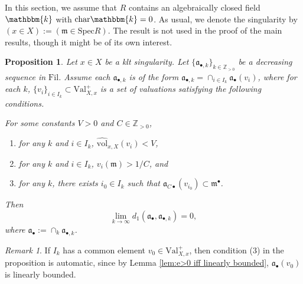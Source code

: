\documentclass[11pt, leqno]{amsart}%
\theoremstyle{plain}
\newtheorem{proposition}[theorem]{Proposition}
\theoremstyle{definition}
\theoremstyle{remark}
\newtheorem{remark}[theorem]{Remark}
\newcommand{\bZ}{\mathbb{Z}}
\newcommand{\fa}{\mathfrak{a}}
\newcommand{\fm}{\mathfrak{m}}
\newcommand{\Val}{\mathrm{Val}}
\newcommand{\nvol}{\widehat{\mathrm{vol}}}
\newcommand{\Spec}{\mathrm{Spec}}
\newcommand{\bk}{\mathbbm{k}}
\newcommand{\Fil}{\mathrm{Fil}}
\numberwithin{equation}{section}
\begin{document}
In this section, we assume that $R$ contains an algebraically closed field $\bk$ with $\mathrm{char}\bk=0$. As usual, we denote the singularity by $(x\in X):=(\fm\in\Spec R)$. The result is not used in the proof of the main results, though it might be of its own interest.

\begin{proposition}\label{prop:continuity along intersection with nvol bounded}
    Let $x\in X$ be a klt singularity. Let $\{\fa_{\bullet,k}\}_{k\in\bZ_{>0}}$ be a decreasing sequence in $\Fil$. Assume each $\fa_{\bullet,k}$ is of the form $\fa_{\bullet,k}=\cap_{i\in I_k}\fa_\bullet(v_i)$, where for each $k$, $\{v_i\}_{i\in I_k}\subset \Val^+_{X,x}$ is a set of valuations satisfying the following conditions.
	
    For some constants $V>0$ and $C\in\bZ_{>0}$, 
    \begin{enumerate}
        \item for any $k$ and $i\in I_k$, $\nvol_{x,X}(v_i)<V$,
		
        \item for any $k$ and $i\in I_k$, $v_i(\fm)>1/C$, and
		
        \item for any $k$, there exists $i_0\in I_k$ such that $\fa_{C\bullet}(v_{i_0})\subset \fm^\bullet$.
    \end{enumerate}
    Then
    \[
        \lim_{k\to\infty}d_1(\fa_\bullet,\fa_{\bullet,k})=0,
    \]
    where $\fa_\bullet:=\cap_k\fa_{\bullet,k}$. 
\end{proposition}

\begin{remark}
    If $I_k$ has a common element $v_0\in\Val^+_{X,x}$, then condition (3) in the proposition is automatic, since by Lemma \ref{lem:e>0 iff linearly bounded}, $\fa_\bullet(v_0)$ is linearly bounded.
\end{remark}
\end{document}
